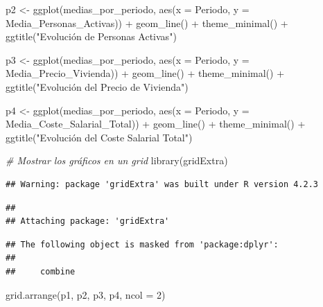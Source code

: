 \documentclass[
]{article}
\newenvironment{Shaded}{\begin{snugshade}}{\end{snugshade}}
\newcommand{\AttributeTok}[1]{\textcolor[rgb]{0.77,0.63,0.00}{#1}}
\newcommand{\CommentTok}[1]{\textcolor[rgb]{0.56,0.35,0.01}{\textit{#1}}}
\newcommand{\DecValTok}[1]{\textcolor[rgb]{0.00,0.00,0.81}{#1}}
\newcommand{\FunctionTok}[1]{\textcolor[rgb]{0.00,0.00,0.00}{#1}}
\newcommand{\NormalTok}[1]{#1}
\newcommand{\OtherTok}[1]{\textcolor[rgb]{0.56,0.35,0.01}{#1}}
\newcommand{\SpecialCharTok}[1]{\textcolor[rgb]{0.00,0.00,0.00}{#1}}
\newcommand{\StringTok}[1]{\textcolor[rgb]{0.31,0.60,0.02}{#1}}
\begin{document}
\begin{Shaded}
\begin{Highlighting}[]
\NormalTok{p2 }\OtherTok{\textless{}{-}} \FunctionTok{ggplot}\NormalTok{(medias\_por\_periodo, }\FunctionTok{aes}\NormalTok{(}\AttributeTok{x =}\NormalTok{ Periodo, }\AttributeTok{y =}\NormalTok{ Media\_Personas\_Activas)) }\SpecialCharTok{+}
  \FunctionTok{geom\_line}\NormalTok{() }\SpecialCharTok{+}
  \FunctionTok{theme\_minimal}\NormalTok{() }\SpecialCharTok{+}
  \FunctionTok{ggtitle}\NormalTok{(}\StringTok{"Evolución de Personas Activas"}\NormalTok{)}

\NormalTok{p3 }\OtherTok{\textless{}{-}} \FunctionTok{ggplot}\NormalTok{(medias\_por\_periodo, }\FunctionTok{aes}\NormalTok{(}\AttributeTok{x =}\NormalTok{ Periodo, }\AttributeTok{y =}\NormalTok{ Media\_Precio\_Vivienda)) }\SpecialCharTok{+}
  \FunctionTok{geom\_line}\NormalTok{() }\SpecialCharTok{+}
  \FunctionTok{theme\_minimal}\NormalTok{() }\SpecialCharTok{+}
  \FunctionTok{ggtitle}\NormalTok{(}\StringTok{"Evolución del Precio de Vivienda"}\NormalTok{)}

\NormalTok{p4 }\OtherTok{\textless{}{-}} \FunctionTok{ggplot}\NormalTok{(medias\_por\_periodo, }\FunctionTok{aes}\NormalTok{(}\AttributeTok{x =}\NormalTok{ Periodo, }\AttributeTok{y =}\NormalTok{ Media\_Coste\_Salarial\_Total)) }\SpecialCharTok{+}
  \FunctionTok{geom\_line}\NormalTok{() }\SpecialCharTok{+}
  \FunctionTok{theme\_minimal}\NormalTok{() }\SpecialCharTok{+}
  \FunctionTok{ggtitle}\NormalTok{(}\StringTok{"Evolución del Coste Salarial Total"}\NormalTok{)}

\CommentTok{\# Mostrar los gráficos en un grid}
\FunctionTok{library}\NormalTok{(gridExtra)}
\end{Highlighting}
\end{Shaded}

\begin{verbatim}
## Warning: package 'gridExtra' was built under R version 4.2.3
\end{verbatim}

\begin{verbatim}
## 
## Attaching package: 'gridExtra'
\end{verbatim}

\begin{verbatim}
## The following object is masked from 'package:dplyr':
## 
##     combine
\end{verbatim}

\begin{Shaded}
\begin{Highlighting}[]
\FunctionTok{grid.arrange}\NormalTok{(p1, p2, p3, p4, }\AttributeTok{ncol =} \DecValTok{2}\NormalTok{)}
\end{Highlighting}
\end{Shaded}
\end{document}
